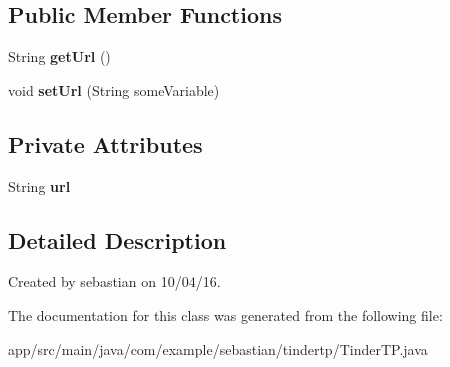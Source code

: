\subsection*{Public Member Functions}
\begin{DoxyCompactItemize}
\item 
String {\bfseries get\+Url} ()\hypertarget{classcom_1_1example_1_1sebastian_1_1tindertp_1_1TinderTP_aeafe473ca5a57f96c542ab5d9070a1d5}{}\label{classcom_1_1example_1_1sebastian_1_1tindertp_1_1TinderTP_aeafe473ca5a57f96c542ab5d9070a1d5}

\item 
void {\bfseries set\+Url} (String some\+Variable)\hypertarget{classcom_1_1example_1_1sebastian_1_1tindertp_1_1TinderTP_ae2a93b041e5812de4e7f5e89b8b20c7f}{}\label{classcom_1_1example_1_1sebastian_1_1tindertp_1_1TinderTP_ae2a93b041e5812de4e7f5e89b8b20c7f}

\end{DoxyCompactItemize}
\subsection*{Private Attributes}
\begin{DoxyCompactItemize}
\item 
String {\bfseries url}\hypertarget{classcom_1_1example_1_1sebastian_1_1tindertp_1_1TinderTP_ad5a61c51254773e9befd2fa7736abe1b}{}\label{classcom_1_1example_1_1sebastian_1_1tindertp_1_1TinderTP_ad5a61c51254773e9befd2fa7736abe1b}

\end{DoxyCompactItemize}


\subsection{Detailed Description}
Created by sebastian on 10/04/16. 

The documentation for this class was generated from the following file\+:\begin{DoxyCompactItemize}
\item 
app/src/main/java/com/example/sebastian/tindertp/Tinder\+T\+P.\+java\end{DoxyCompactItemize}
